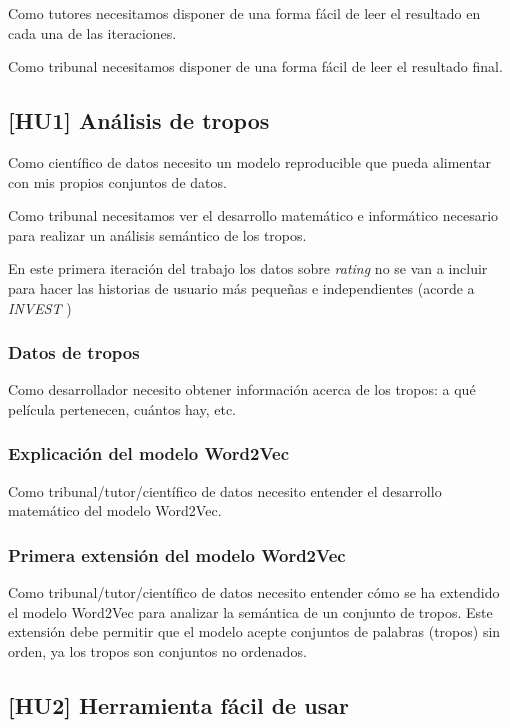 Como tutores necesitamos disponer de una forma fácil de leer el resultado en cada
una de las iteraciones.

Como tribunal necesitamos disponer de una forma fácil de leer el resultado final.

\subsection{[HU1] Análisis de tropos}

Como científico de datos necesito un modelo reproducible que pueda alimentar con mis propios
conjuntos de datos.

Como tribunal necesitamos ver el desarrollo matemático e informático necesario para realizar
un análisis semántico de los tropos.

En este primera iteración del trabajo los datos sobre \textit{rating} no se van a incluir para
hacer las historias de usuario más pequeñas e independientes (acorde a \textit{INVEST} \cite{buglione2013improving})

\subsubsection{Datos de tropos}\label{uc:datos_tropos}

Como desarrollador necesito obtener información acerca de los
tropos: a qué película pertenecen, cuántos hay, etc.

\subsubsection{Explicación del modelo Word2Vec}\label{uc:word2vec_explicacion}

Como tribunal/tutor/científico de datos necesito entender el desarrollo matemático del modelo Word2Vec.

\subsubsection{Primera extensión del modelo Word2Vec}\label{uc:word2vec_primera_extension}

Como tribunal/tutor/científico de datos
necesito entender cómo se ha extendido el modelo Word2Vec para analizar la semántica de un conjunto de
tropos. Este extensión debe permitir que el modelo acepte conjuntos de palabras (tropos) sin orden, ya
los tropos son conjuntos no ordenados.

\subsection{[HU2] Herramienta fácil de usar}\label{uc:herramienta_guionistas}


